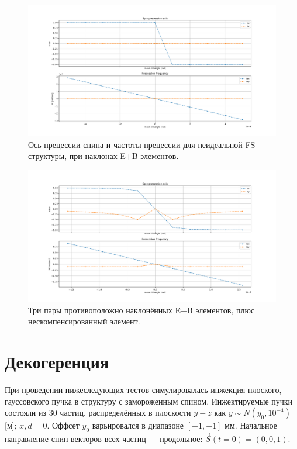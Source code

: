 \documentclass{report}
\begin{document}
\begin{figure}[H]
  \includegraphics[width=\textwidth]{edm_img/linearity_test_shifting_gauss}
  \caption{Ось прецессии спина и частоты прецессии для неидеальной FS
    структуры, при наклонах E+B элементов.\label{fig:Linearity_test_shifting_gauss}}
\end{figure}
\begin{figure}[H]
  \includegraphics[width=\textwidth]{edm_img/linearity_test_compensated+microrad}
  \caption{Три пары противоположно наклонённых E+B элементов, плюс
    нескомпенсированный элемент.\label{fig:Linearity_test_compensated}}
\end{figure}


\section{Декогеренция}
При проведении нижеследующих тестов симулировалась инжекция
плоского, гауссовского пучка в структуру с замороженным
спином. Инжектируемые пучки состояли из 30 частиц, распределённых в
плоскости $y-z$ как $y\sim N(y_0, 10^{-4})$ [м]; $x,d =
0$. Оффсет $y_0$ варьировался в диапазоне $[-1, +1]$ мм. Начальное
направление спин-векторов всех частиц --- продольное: $\vec S(t=0) = (0,0,1)$.
\end{document}
